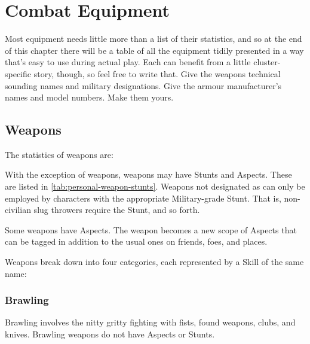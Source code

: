 \section{Combat Equipment}
\label{sec:personal-combat-equipment}

Most equipment needs little more than a list of their statistics, and so at the end of this chapter there will be a table of all the equipment tidily presented in a way that's easy to use during actual play. Each can benefit from a little cluster-specific story, though, so feel free to write that. Give the weapons technical sounding names and military designations. Give the armour manufacturer's names and model numbers. Make them yours.



\subsection{Weapons}

The statistics of weapons are:



With the exception of  weapons, weapons may have Stunts and Aspects. These are listed in \autoref{tab:personal-weapon-stunts}. Weapons not designated as  can only be employed by characters with the appropriate Military-grade Stunt. That is, non-civilian slug throwers require the  Stunt, and so forth.

Some weapons have Aspects. The weapon becomes a new scope of Aspects that can be tagged in addition to the usual ones on friends, foes, and places.

Weapons break down into four categories, each represented by a Skill of the same name:

\subsubsection{Brawling}
\label{sec:brawling}

Brawling involves the nitty gritty fighting with fists, found weapons, clubs, and knives. Brawling weapons do not have Aspects or Stunts.

